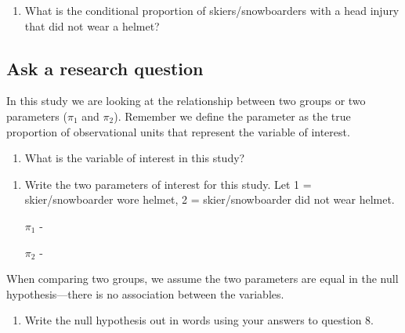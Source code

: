 \documentclass[
]{report}
\providecommand{\tightlist}{%
  \setlength{\itemsep}{0pt}\setlength{\parskip}{0pt}}
\begin{document}
\begin{enumerate}
\def\labelenumi{\arabic{enumi}.}
\setcounter{enumi}{5}
\tightlist
\item
  What is the conditional proportion of skiers/snowboarders with a head injury that did not wear a helmet?
\end{enumerate}

\vspace{.6in}

\hypertarget{ask-a-research-question}{%
\subsection{Ask a research question}\label{ask-a-research-question}}

In this study we are looking at the relationship between two groups or two parameters (\(\pi_1\) and \(\pi_2\)). Remember we define the parameter as the true proportion of observational units that represent the variable of interest.

\begin{enumerate}
\def\labelenumi{\arabic{enumi}.}
\setcounter{enumi}{6}
\tightlist
\item
  What is the variable of interest in this study?
\end{enumerate}

\vspace{0.5in}

\begin{enumerate}
\def\labelenumi{\arabic{enumi}.}
\setcounter{enumi}{7}
\item
  Write the two parameters of interest for this study. Let 1 = skier/snowboarder wore helmet, 2 = skier/snowboarder did not wear helmet.

  \(\pi_1\) -
  \vspace{0.5in}

  \(\pi_2\) -
  \vspace{0.5in}
\end{enumerate}

When comparing two groups, we assume the two parameters are equal in the null hypothesis---there is no association between the variables.

\begin{enumerate}
\def\labelenumi{\arabic{enumi}.}
\setcounter{enumi}{8}
\tightlist
\item
  Write the null hypothesis out in words using your answers to question 8.
\end{enumerate}
\end{document}
